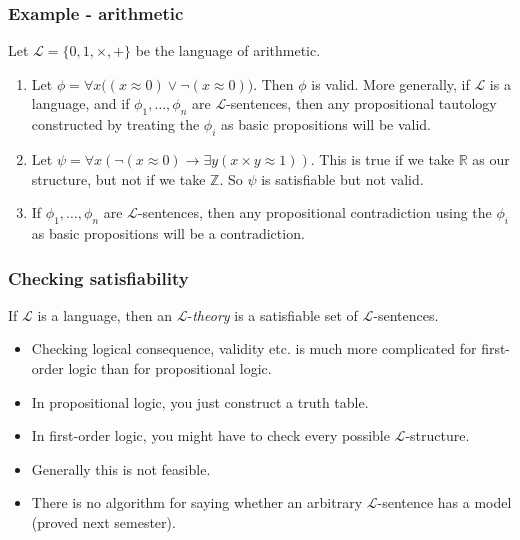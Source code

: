 \documentclass[handout]{beamer}
\newcommand{\sL}{\mathscr{L}}
\newcommand{\bZ}{\mathbb{Z}}
\newcommand{\bR}{\mathbb{R}}
\begin{document}
\begin{frame}
\frametitle{Example - arithmetic}
\begin{example}
Let $\sL=\{0,1,\times,+\}$ be the language of arithmetic.
\begin{enumerate}
\item Let $\phi = \forall x\big((x\approx 0)\vee \neg(x\approx 0)\big)$. Then $\phi$ is valid. More generally, if $\sL$ is a language, and if $\phi_1,\ldots,\phi_n$ are $\sL$-sentences, then any propositional tautology constructed by treating the $\phi_i$ as basic propositions will be valid.
\vspace{0.2cm}
\item Let $\psi= \forall x(\neg(x\approx 0)\rightarrow \exists y(x\times y\approx 1))$. This is true if we take $\bR$ as our structure, but not if we take $\bZ$. So $\psi$ is satisfiable but not valid.
\vspace{0.2cm}
\item If $\phi_1,\ldots,\phi_n$ are $\sL$-sentences, then any propositional contradiction using the $\phi_i$ as basic propositions will be a contradiction. 
\end{enumerate}
\end{example}
\end{frame}

\begin{frame}
\frametitle{Checking satisfiability}
\begin{definition}[Theory]\label{D:theory}
If $\sL$ is a language, then an $\sL$-\emph{theory} is a satisfiable set of $\sL$-sentences. 
\end{definition}
\vspace{0.5cm}
\begin{itemize}
\item Checking logical consequence, validity etc. is much more complicated for first-order logic than for propositional logic.
\vspace{0.2cm}
\item In propositional logic, you just construct a truth table.
\vspace{0.2cm}
\item In first-order logic, you might have to check every possible $\sL$-structure.
\vspace{0.2cm}
\item Generally this is not feasible.
\vspace{0.2cm}
\item There is no algorithm for saying whether an arbitrary $\sL$-sentence has a model (proved next semester).
\end{itemize}
\end{frame}
\end{document}
